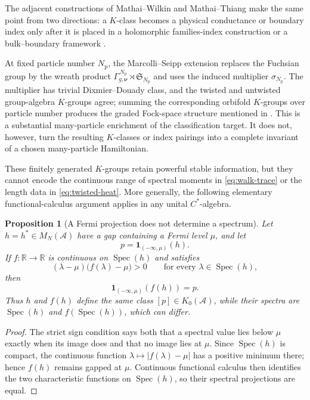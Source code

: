 \documentclass[11pt]{article}
\newtheorem{proposition}[theorem]{Proposition}
\theoremstyle{definition}
\theoremstyle{remark}
\newcommand{\RR}{\mathbb R}
\newcommand{\spec}{\operatorname{Spec}}
\begin{document}
The adjacent constructions of Mathai--Wilkin and Mathai--Thiang make the same
point from two directions: a \(K\)-class becomes a physical conductance or
boundary index only after it is placed in a holomorphic families-index
construction or a bulk--boundary framework
\cite{MathaiWilkin2019,MathaiThiang2019}.

At fixed particle number \(N_{\mathrm p}\), the Marcolli--Seipp extension
replaces the Fuchsian group by the wreath product
\(\Gamma_{g,\bm\nu}^{\,N_{\mathrm p}}\rtimes
\mathfrak S_{N_{\mathrm p}}\) and uses the induced multiplier
\(\sigma_{N_{\mathrm p}}\).  The multiplier has trivial
Dixmier--Douady class, and the twisted and untwisted group-algebra
\(K\)-groups agree; summing the corresponding orbifold \(K\)-groups over
particle number produces the graded Fock-space structure mentioned in
 \cite{MarcolliSeipp2017}.  This is a substantial
many-particle enrichment of the classification target.  It does not,
however, turn the resulting \(K\)-classes or index pairings into a complete
invariant of a chosen many-particle Hamiltonian.

These finitely generated \(K\)-groups retain powerful stable information,
but they cannot encode the continuous range of spectral moments in
\eqref{eq:walk-trace} or the length data in \eqref{eq:twisted-heat}.  More
generally, the following elementary functional-calculus argument applies in
any unital \(C^*\)-algebra.

\begin{proposition}[A Fermi projection does not determine a spectrum]
\label{prop:functional-calculus}
Let \(h=h^*\in M_N(\mathcal A)\) have a gap containing a Fermi level \(\mu\),
and let
\[
                     p=\mathbf1_{(-\infty,\mu)}(h).
                     \tag{9.3}\label{eq:fermi-projection}
\]
If \(f:\RR\to\RR\) is continuous on \(\spec(h)\) and satisfies
\[
       (\lambda-\mu)\bigl(f(\lambda)-\mu\bigr)>0
       \qquad\text{for every }\lambda\in\spec(h),
\]
then
\[
           \mathbf1_{(-\infty,\mu)}(f(h))=p.
           \tag{9.4}\label{eq:same-fermi}
\]
Thus \(h\) and \(f(h)\) define the same class \([p]\in K_0(\mathcal A)\), while
their spectra are \(\spec(h)\) and \(f(\spec(h))\), which can differ.
\end{proposition}

\begin{proof}
The strict sign condition says both that a spectral value lies below \(\mu\)
exactly when its image does and that no image lies at \(\mu\).  Since
\(\spec(h)\) is compact, the continuous function
\(\lambda\mapsto|f(\lambda)-\mu|\) has a positive minimum there; hence
\(f(h)\) remains gapped at \(\mu\).  Continuous functional calculus then
identifies the two characteristic functions on \(\spec(h)\), so their
spectral projections are equal.
\end{proof}
\end{document}

